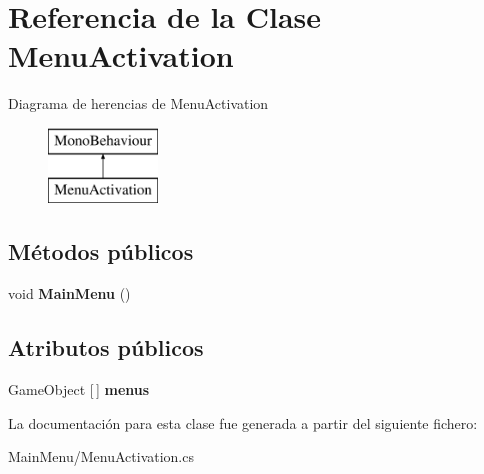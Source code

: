 \hypertarget{class_menu_activation}{}\section{Referencia de la Clase Menu\+Activation}
\label{class_menu_activation}
Diagrama de herencias de Menu\+Activation\begin{figure}[H]
\begin{center}
\leavevmode
\includegraphics[height=2.000000cm]{class_menu_activation}
\end{center}
\end{figure}
\subsection*{Métodos públicos}
\begin{DoxyCompactItemize}
\item 
\mbox{\label{class_menu_activation_a33c2996911d4edd216846a868c94ab72}} 
void {\bfseries Main\+Menu} ()
\end{DoxyCompactItemize}
\subsection*{Atributos públicos}
\begin{DoxyCompactItemize}
\item 
\mbox{\label{class_menu_activation_a2fafee3893d91c1f926282e7d92b3b92}} 
Game\+Object \mbox{[}$\,$\mbox{]} {\bfseries menus}
\end{DoxyCompactItemize}


La documentación para esta clase fue generada a partir del siguiente fichero\+:\begin{DoxyCompactItemize}
\item 
Main\+Menu/Menu\+Activation.\+cs\end{DoxyCompactItemize}
